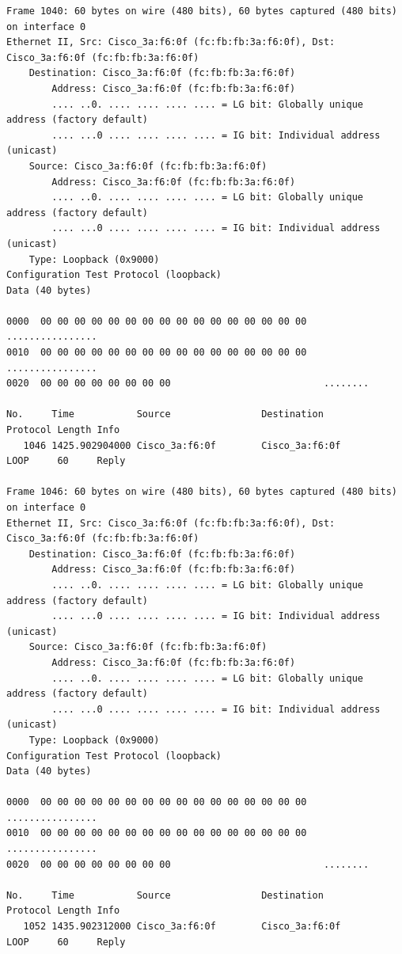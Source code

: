 \documentclass[a4paper,11pt]{article}
\begin{document}
\begin{lstlisting}
Frame 1040: 60 bytes on wire (480 bits), 60 bytes captured (480 bits) on interface 0
Ethernet II, Src: Cisco_3a:f6:0f (fc:fb:fb:3a:f6:0f), Dst: Cisco_3a:f6:0f (fc:fb:fb:3a:f6:0f)
    Destination: Cisco_3a:f6:0f (fc:fb:fb:3a:f6:0f)
        Address: Cisco_3a:f6:0f (fc:fb:fb:3a:f6:0f)
        .... ..0. .... .... .... .... = LG bit: Globally unique address (factory default)
        .... ...0 .... .... .... .... = IG bit: Individual address (unicast)
    Source: Cisco_3a:f6:0f (fc:fb:fb:3a:f6:0f)
        Address: Cisco_3a:f6:0f (fc:fb:fb:3a:f6:0f)
        .... ..0. .... .... .... .... = LG bit: Globally unique address (factory default)
        .... ...0 .... .... .... .... = IG bit: Individual address (unicast)
    Type: Loopback (0x9000)
Configuration Test Protocol (loopback)
Data (40 bytes)

0000  00 00 00 00 00 00 00 00 00 00 00 00 00 00 00 00   ................
0010  00 00 00 00 00 00 00 00 00 00 00 00 00 00 00 00   ................
0020  00 00 00 00 00 00 00 00                           ........

No.     Time           Source                Destination           Protocol Length Info
   1046 1425.902904000 Cisco_3a:f6:0f        Cisco_3a:f6:0f        LOOP     60     Reply

Frame 1046: 60 bytes on wire (480 bits), 60 bytes captured (480 bits) on interface 0
Ethernet II, Src: Cisco_3a:f6:0f (fc:fb:fb:3a:f6:0f), Dst: Cisco_3a:f6:0f (fc:fb:fb:3a:f6:0f)
    Destination: Cisco_3a:f6:0f (fc:fb:fb:3a:f6:0f)
        Address: Cisco_3a:f6:0f (fc:fb:fb:3a:f6:0f)
        .... ..0. .... .... .... .... = LG bit: Globally unique address (factory default)
        .... ...0 .... .... .... .... = IG bit: Individual address (unicast)
    Source: Cisco_3a:f6:0f (fc:fb:fb:3a:f6:0f)
        Address: Cisco_3a:f6:0f (fc:fb:fb:3a:f6:0f)
        .... ..0. .... .... .... .... = LG bit: Globally unique address (factory default)
        .... ...0 .... .... .... .... = IG bit: Individual address (unicast)
    Type: Loopback (0x9000)
Configuration Test Protocol (loopback)
Data (40 bytes)

0000  00 00 00 00 00 00 00 00 00 00 00 00 00 00 00 00   ................
0010  00 00 00 00 00 00 00 00 00 00 00 00 00 00 00 00   ................
0020  00 00 00 00 00 00 00 00                           ........

No.     Time           Source                Destination           Protocol Length Info
   1052 1435.902312000 Cisco_3a:f6:0f        Cisco_3a:f6:0f        LOOP     60     Reply


\end{lstlisting}
\end{document}
